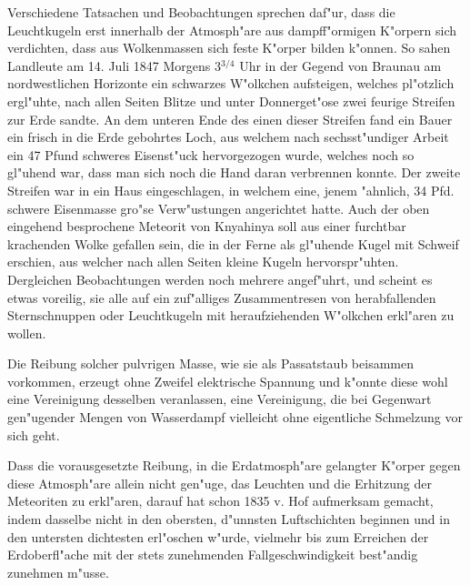 \documentclass[a4paper, 11pt, oneside]{article}
\begin{document}
Verschiedene Tatsachen und Beobachtungen sprechen daf"ur, dass die Leuchtkugeln erst innerhalb der Atmosph"are aus dampff"ormigen K"orpern sich verdichten, dass aus Wolkenmassen sich feste K"orper bilden k"onnen. So sahen Landleute am 14. Juli 1847 Morgens 3$^{3/4}$ Uhr in der Gegend von Braunau am nordwestlichen Horizonte ein schwarzes W"olkchen aufsteigen, welches pl"otzlich ergl"uhte, nach allen Seiten Blitze und unter Donnerget"ose zwei feurige Streifen zur Erde sandte. An dem unteren Ende des einen dieser Streifen fand ein Bauer ein frisch in die Erde gebohrtes Loch, aus welchem nach sechsst"undiger Arbeit ein 47 Pfund schweres Eisenst"uck hervorgezogen wurde, welches noch so gl"uhend war, dass man sich noch die Hand daran verbrennen konnte. Der zweite Streifen war in ein Haus eingeschlagen, in welchem eine, jenem "ahnlich, 34 Pfd. schwere Eisenmasse gro"se Verw"ustungen angerichtet hatte. Auch der oben eingehend besprochene Meteorit von Knyahinya soll aus einer furchtbar krachenden Wolke gefallen sein, die in der Ferne als gl"uhende Kugel mit Schweif erschien, aus welcher nach allen Seiten kleine Kugeln hervorspr"uhten. Dergleichen Beobachtungen werden noch mehrere angef"uhrt, und scheint es etwas voreilig, sie alle auf ein zuf"alliges Zusammentresen von herabfallenden Sternschnuppen oder Leuchtkugeln mit heraufziehenden W"olkchen erkl"aren zu wollen.

Die Reibung solcher pulvrigen Masse, wie sie als Passatstaub beisammen vorkommen, erzeugt ohne Zweifel elektrische Spannung und k"onnte diese wohl eine Vereinigung desselben veranlassen, eine Vereinigung, die bei Gegenwart gen"ugender Mengen von Wasserdampf vielleicht ohne eigentliche Schmelzung vor sich geht.

Dass die vorausgesetzte Reibung, in die Erdatmosph"are gelangter K"orper gegen diese Atmosph"are allein nicht gen"uge, das Leuchten und die Erhitzung der Meteoriten zu erkl"aren, darauf hat schon 1835 v. Hof aufmerksam gemacht, indem dasselbe nicht in den obersten, d"unnsten Luftschichten beginnen und in den untersten dichtesten erl"oschen w"urde, vielmehr bis zum Erreichen der Erdoberfl"ache mit der stets zunehmenden Fallgeschwindigkeit best"andig zunehmen m"usse.
\end{document}
